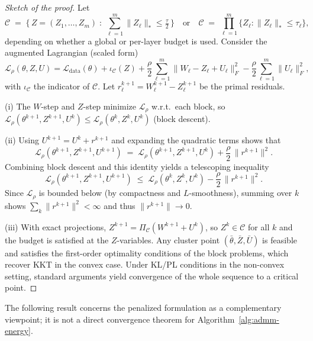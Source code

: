 \documentclass[a4paper,fleqn]{cas-sc}
\theoremstyle{remark}
\theoremstyle{definition}
\begin{document}
\begin{proof}[Sketch of the proof]
Let
\[
  \mathcal{C} \;=\;
  \Big\{\, Z=(Z_1,\dots,Z_m)\;:\;\sum_{\ell=1}^m \|Z_\ell\|_{\ast}\le \tfrac{\tau}{2}\,\Big\}
  \quad\text{or}\quad
  \mathcal{C} \;=\; \prod_{\ell=1}^m \big\{Z_\ell:\|Z_\ell\|_{\ast}\le \tau_\ell\big\},
\]
depending on whether a global or per-layer budget is used. Consider the augmented Lagrangian (scaled form)
\[
  \mathcal{L}_\rho(\theta,Z,U)
  = \mathcal{L}_{\text{data}}(\theta) + \iota_{\mathcal{C}}(Z)
     + \frac{\rho}{2}\sum_{\ell=1}^m \|W_\ell - Z_\ell + U_\ell\|_F^2
     - \frac{\rho}{2}\sum_{\ell=1}^m \|U_\ell\|_F^2,
\]
with $\iota_{\mathcal{C}}$ the indicator of $\mathcal{C}$. Let $r_\ell^{k+1} = W_\ell^{k+1} - Z_\ell^{k+1}$ be the primal residuals.

(i) The $W$-step and $Z$-step minimize $\mathcal{L}_\rho$ w.r.t.\ each block, so $\mathcal{L}_\rho(\theta^{k+1},Z^{k+1},U^{k}) \le \mathcal{L}_\rho(\theta^{k},Z^{k},U^{k})$ (block descent). 

(ii) Using $U^{k+1}=U^k+r^{k+1}$ and expanding the quadratic terms shows that
\[
  \mathcal{L}_\rho(\theta^{k+1},Z^{k+1},U^{k+1})
  \;=\; \mathcal{L}_\rho(\theta^{k+1},Z^{k+1},U^{k})
        + \frac{\rho}{2}\,\|r^{k+1}\|^2.
\]
Combining block descent and this identity yields a telescoping inequality
\[
  \mathcal{L}_\rho(\theta^{k+1},Z^{k+1},U^{k+1})
  \;\le\; \mathcal{L}_\rho(\theta^{k},Z^{k},U^{k})
        - \frac{\rho}{2}\,\|r^{k+1}\|^2.
\]
Since $\mathcal{L}_\rho$ is bounded below (by compactness and $L$-smoothness), summing over $k$ shows $\sum_k\|r^{k+1}\|^2<\infty$ and thus $\|r^{k+1}\|\to 0$.

(iii) With exact projections, $Z^{k+1}=\Pi_{\mathcal{C}}(W^{k+1}+U^k)$, so $Z^k\in\mathcal{C}$ for all $k$ and the budget is satisfied at the $Z$-variables. Any cluster point $(\bar\theta,\bar Z,\bar U)$ is feasible and satisfies the first-order optimality conditions of the block problems, which recover KKT in the convex case. Under KL/PL conditions in the non-convex setting, standard arguments yield convergence of the whole sequence to a critical point.
\end{proof}

The following result concerns the penalized formulation as a complementary viewpoint; it is not a direct convergence theorem for Algorithm~\ref{alg:admm-energy}.
\end{document}
